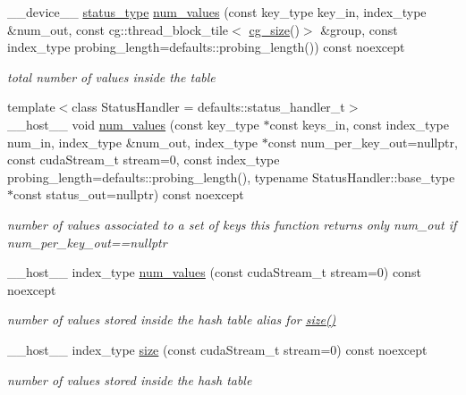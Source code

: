 \begin{DoxyCompactItemize}
\+\_\+\+\_\+device\+\_\+\+\_\+ \hyperlink{classwarpcore_1_1Status}{status\+\_\+type} \hyperlink{classwarpcore_1_1MultiValueHashTable_ada2a3052b76a7d71bab214b1f466e4da}{num\+\_\+values} (const key\+\_\+type key\+\_\+in, index\+\_\+type \&num\+\_\+out, const cg\+::thread\+\_\+block\+\_\+tile$<$ \hyperlink{classwarpcore_1_1MultiValueHashTable_ad300c5a01bd933343ff08176fb4b4e29}{cg\+\_\+size}()$>$ \&group, const index\+\_\+type probing\+\_\+length=defaults\+::probing\+\_\+length()) const noexcept
\begin{DoxyCompactList}\small\item\em total number of values inside the table \end{DoxyCompactList}\item 
{\footnotesize template$<$class Status\+Handler  = defaults\+::status\+\_\+handler\+\_\+t$>$ }\\\+\_\+\+\_\+host\+\_\+\+\_\+ void \hyperlink{classwarpcore_1_1MultiValueHashTable_a95c52ddbf4d9ae84240b3c94ef6cb833}{num\+\_\+values} (const key\+\_\+type $\ast$const keys\+\_\+in, const index\+\_\+type num\+\_\+in, index\+\_\+type \&num\+\_\+out, index\+\_\+type $\ast$const num\+\_\+per\+\_\+key\+\_\+out=nullptr, const cuda\+Stream\+\_\+t stream=0, const index\+\_\+type probing\+\_\+length=defaults\+::probing\+\_\+length(), typename Status\+Handler\+::base\+\_\+type $\ast$const status\+\_\+out=nullptr) const noexcept
\begin{DoxyCompactList}\small\item\em number of values associated to a set of keys  this function returns only {\ttfamily num\+\_\+out} if {\ttfamily num\+\_\+per\+\_\+key\+\_\+out==nullptr} \end{DoxyCompactList}\item 
\+\_\+\+\_\+host\+\_\+\+\_\+ index\+\_\+type \hyperlink{classwarpcore_1_1MultiValueHashTable_afba396891eeb4902e22b112bbafe7945}{num\+\_\+values} (const cuda\+Stream\+\_\+t stream=0) const noexcept
\begin{DoxyCompactList}\small\item\em number of values stored inside the hash table  alias for {\ttfamily \hyperlink{classwarpcore_1_1MultiValueHashTable_a1be160768bafcae409e3a37ee2829d9f}{size()}} \end{DoxyCompactList}\item 
\+\_\+\+\_\+host\+\_\+\+\_\+ index\+\_\+type \hyperlink{classwarpcore_1_1MultiValueHashTable_a1be160768bafcae409e3a37ee2829d9f}{size} (const cuda\+Stream\+\_\+t stream=0) const noexcept
\begin{DoxyCompactList}\small\item\em number of values stored inside the hash table \end{DoxyCompactList}\item 

\end{DoxyCompactItemize}
